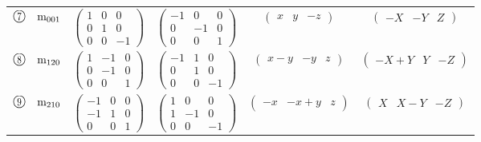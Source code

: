 \documentclass[fleqn,10pt,landscape]{jsarticle}
\begin{document}
\begin{center}
\begin{longtable}{lcccc}
$ {\ooalign{\hfil\resizebox{.8\width}{\height}{7}\hfil\crcr\raise.1ex\hbox{\large$\bigcirc$}}}\quad {\rm m}_{001} $ & $ \begin{pmatrix} 1 & 0 & 0 \\ 0 & 1 & 0 \\ 0 & 0 & -1 \end{pmatrix} $ & $ \begin{pmatrix} -1 & 0 & 0 \\ 0 & -1 & 0 \\ 0 & 0 & 1 \end{pmatrix} $ & $ \begin{pmatrix} x & y & - z \end{pmatrix} $ & $ \begin{pmatrix} - X & - Y & Z \end{pmatrix} $ \\
$ {\ooalign{\hfil\resizebox{.8\width}{\height}{8}\hfil\crcr\raise.1ex\hbox{\large$\bigcirc$}}}\quad {\rm m}_{120} $ & $ \begin{pmatrix} 1 & -1 & 0 \\ 0 & -1 & 0 \\ 0 & 0 & 1 \end{pmatrix} $ & $ \begin{pmatrix} -1 & 1 & 0 \\ 0 & 1 & 0 \\ 0 & 0 & -1 \end{pmatrix} $ & $ \begin{pmatrix} x - y & - y & z \end{pmatrix} $ & $ \begin{pmatrix} - X + Y & Y & - Z \end{pmatrix} $ \\
$ {\ooalign{\hfil\resizebox{.8\width}{\height}{9}\hfil\crcr\raise.1ex\hbox{\large$\bigcirc$}}}\quad {\rm m}_{210} $ & $ \begin{pmatrix} -1 & 0 & 0 \\ -1 & 1 & 0 \\ 0 & 0 & 1 \end{pmatrix} $ & $ \begin{pmatrix} 1 & 0 & 0 \\ 1 & -1 & 0 \\ 0 & 0 & -1 \end{pmatrix} $ & $ \begin{pmatrix} - x & - x + y & z \end{pmatrix} $ & $ \begin{pmatrix} X & X - Y & - Z \end{pmatrix} $ \\

\end{longtable}
\end{center}
\end{document}
